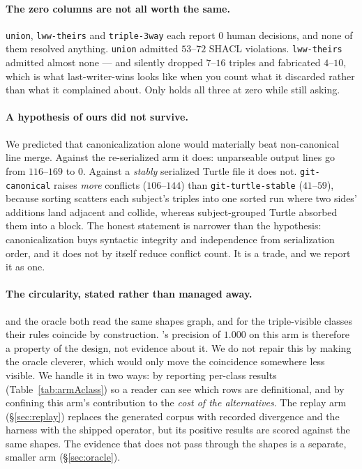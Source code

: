 \paragraph{The zero columns are not all worth the same.} \texttt{union},
\texttt{lww-theirs} and \texttt{triple-3way} each report $0$ human decisions, and
none of them resolved anything. \texttt{union} admitted $53$--$72$ SHACL
violations. \texttt{lww-theirs} admitted almost none --- and silently dropped
$7$--$16$ triples and fabricated $4$--$10$, which is what last-writer-wins looks
like when you count what it discarded rather than what it complained about. Only
\op holds all three at zero while still asking.

\paragraph{A hypothesis of ours did not survive.} We predicted that
canonicalization alone would materially beat non-canonical line merge. Against
the re-serialized arm it does: unparseable output lines go from $116$--$169$ to
$0$. Against a \emph{stably} serialized Turtle file it does not.
\texttt{git-canonical} raises \emph{more} conflicts ($106$--$144$) than
\texttt{git-turtle-stable} ($41$--$59$), because sorting scatters each subject's
triples into one sorted run where two sides' additions land adjacent and collide,
whereas subject-grouped Turtle absorbed them into a block. The honest statement
is narrower than the hypothesis: canonicalization buys syntactic integrity and
independence from serialization order, and it does not by itself reduce conflict
count. It is a trade, and we report it as one.

\paragraph{The circularity, stated rather than managed away.} \op and the oracle
both read the same shapes graph, and for the triple-visible classes their rules
coincide by construction. \op's precision of $1.000$ on this arm is therefore a
property of the design, not evidence about it. We do not repair this by making
the oracle cleverer, which would only move the coincidence somewhere less
visible. We handle it in two ways: by reporting per-class results
(Table~\ref{tab:armAclass}) so a reader can see which rows are definitional, and
by confining this arm's contribution to the \emph{cost of the alternatives}. The replay arm (\S\ref{sec:replay}) replaces the generated
corpus with recorded divergence and the harness with the shipped operator, but
its positive results are scored against the same shapes. The evidence that does
not pass through the shapes is a separate, smaller arm (\S\ref{sec:oracle}).

